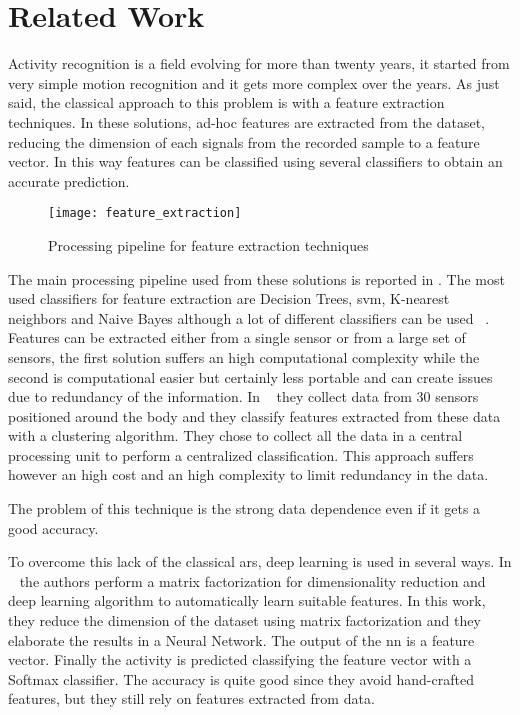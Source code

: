 
\section{Related Work}
\label{sec:related_work}

Activity recognition is a field evolving for more than twenty years, it started from very simple motion recognition and it gets more complex over the years.
As just said, the classical approach to this problem is with a feature extraction techniques.
In these solutions, ad-hoc features are extracted from the dataset, reducing the dimension of each signals from the recorded sample to a feature vector.
In this way features can be classified using several classifiers to obtain an accurate prediction.

\begin{figure}[!ht]
  \centering
  \texttt{[image: feature\_extraction]}
  \label{fig:feature_extraction}
  \caption{Processing pipeline for feature extraction techniques}
\end{figure}

The main processing pipeline used from these solutions is reported in .
The most used classifiers for feature extraction are Decision Trees, \gls{svm}, K-nearest neighbors and Naive Bayes although a lot of different classifiers can be used ~\cite{Ravi05}.
Features can be extracted either from a single sensor or from a large set of sensors, the first solution suffers an high computational complexity while the second is computational easier but certainly less  portable and can create issues due to redundancy of the information.
In ~\cite{Laerhoven02} they collect data from 30 sensors positioned around the body and they classify features extracted from these data with a clustering algorithm. They chose to collect all the data in a central processing unit to perform a centralized classification. This approach suffers however an high cost and an high complexity to limit redundancy in the data.

The problem of this technique is the strong data dependence even if it gets a good accuracy.

To overcome this lack of the classical \gls{ars}, deep learning is used in several ways.
In ~\cite{Chikhaoui17} the authors perform a matrix factorization for dimensionality reduction and deep learning algorithm to automatically learn suitable features.
In this work, they reduce the dimension of the dataset using matrix factorization and they elaborate the results in a Neural Network. The output of the \gls{nn} is a feature vector. Finally the activity is predicted classifying the feature vector with a Softmax classifier.
The accuracy is quite good since they avoid hand-crafted features, but they still rely on features extracted from data.

